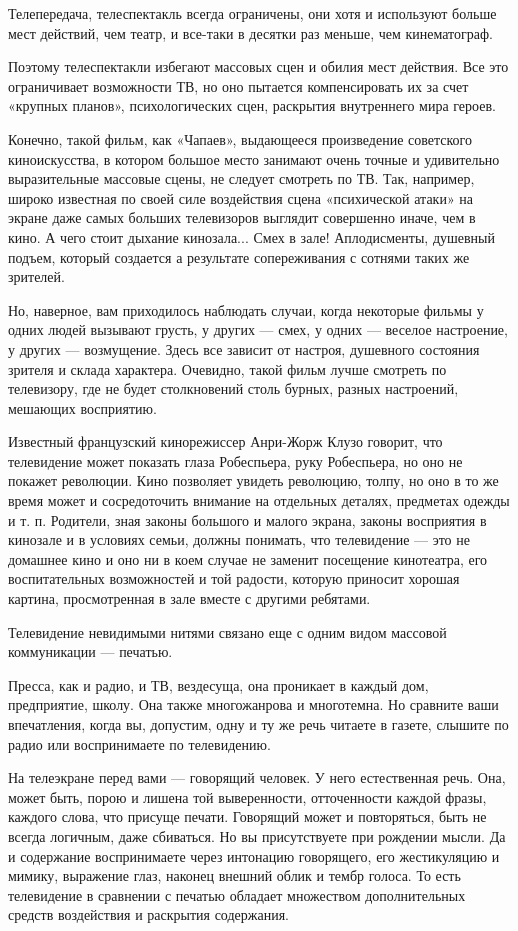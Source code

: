 \documentclass[12pt, a4paper, openany]{book}
\begin{document}
Телепередача, телеспектакль всегда ограничены, они хотя и используют больше мест действий, чем театр, и все-таки в десятки раз меньше, чем кинематограф. 

Поэтому телеспектакли избегают массовых сцен и обилия мест действия. Все это ограничивает возможности ТВ, но оно пытается компенсировать их за счет «крупных планов», психологических сцен, раскрытия внутреннего мира героев. 

Конечно, такой фильм, как «Чапаев», выдающееся произведение советского киноискусства, в котором большое место занимают очень точные и удивительно выразительные массовые сцены, не следует смотреть по ТВ. Так, например, широко известная по своей силе воздействия сцена «психической атаки» на экране даже самых больших телевизоров выглядит совершенно иначе, чем в кино. А чего стоит дыхание кинозала... Смех в зале! Аплодисменты, душевный подъем, который создается а результате сопереживания с сотнями таких же зрителей. 


Но, наверное, вам приходилось наблюдать случаи, когда некоторые фильмы у одних людей вызывают грусть, у других — смех, у одних — веселое настроение, у других — возмущение. Здесь все зависит от настроя, душевного состояния зрителя и склада характера. Очевидно, такой фильм лучше смотреть по телевизору, где не будет столкновений столь бурных, разных настроений, мешающих восприятию. 

Известный французский кинорежиссер Анри-Жорж Клузо говорит, что телевидение может показать глаза Робеспьера, руку Робеспьера, но оно не покажет революции. Кино позволяет увидеть революцию, толпу, но оно в то же время может и сосредоточить внимание на отдельных деталях, предметах одежды и т. п. Родители, зная законы большого и малого экрана, законы восприятия в кинозале и в условиях семьи, должны понимать, что телевидение — это не домашнее кино и оно ни в коем случае не заменит посещение кинотеатра, его воспитательных возможностей и той радости, которую приносит хорошая картина, просмотренная в зале вместе с другими ребятами. 

Телевидение невидимыми нитями связано еще с одним видом массовой коммуникации — печатью. 

Пресса, как и радио, и ТВ, вездесуща, она проникает в каждый дом, предприятие, школу. Она также многожанрова и многотемна. Но сравните ваши впечатления, когда вы, допустим, одну и ту же речь читаете в газете, слышите по радио или воспринимаете по телевидению. 

На телеэкране перед вами — говорящий человек. У него естественная речь. Она, может быть, порою и лишена той выверенности, отточенности каждой фразы, каждого слова, что присуще печати. Говорящий может и повторяться, быть не всегда логичным, даже сбиваться. Но вы присутствуете при рождении мысли. Да и содержание воспринимаете через интонацию говорящего, его жестикуляцию и мимику, выражение глаз, наконец внешний облик и тембр голоса. То есть телевидение в сравнении с печатью обладает множеством дополнительных средств воздействия и раскрытия содержания. 
\end{document}
